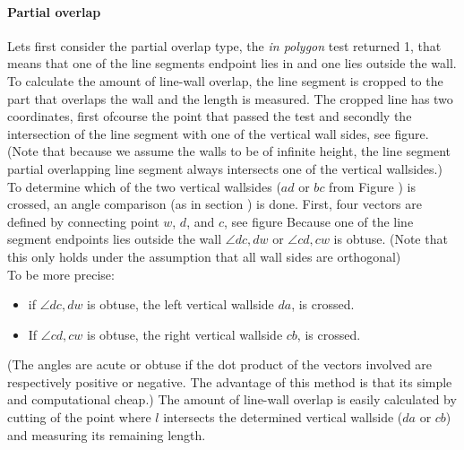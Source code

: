 \documentclass[10pt]{article}
\begin{document}
	\paragraph{Partial overlap}
	Lets first consider the partial overlap type, the \emph{in polygon} test
	returned 1, that means that one of the line segments endpoint lies in
	and one lies outside the wall.
	To calculate the amount of line-wall overlap, the line segment is cropped to the
	part that overlaps the wall and the length is measured. 
	The cropped line has two coordinates, first ofcourse the point that passed
	the  test and secondly the intersection of the line
	segment with one of the vertical wall sides, see figure. %
	(Note that because we assume the walls to be of infinite height, the line
	segment partial overlapping line segment always intersects one of the
	vertical wallsides.)
	To determine which of the two vertical wallsides ($ad$ or $bc$ from Figure
	)
	 is crossed, an angle comparison (as in section %
	 ) is done.
	First, four vectors are defined by connecting point $w$, $d$, and $c$, see figure %
	Because one of the line segment endpoints lies outside
	the wall $\angle dc, dw$ or $\angle cd, cw$ is obtuse. 
	(Note that this only holds under the assumption that all wall sides are orthogonal)\\
	To be more precise: 
	\begin{itemize}
	\item if $\angle dc, dw$ is obtuse, the left vertical wallside $da$, is
	crossed. \\
	\item If $\angle cd, cw$ is obtuse, the right vertical wallside $cb$, is
	crossed. \\
	\end{itemize}
	(The angles are acute or obtuse if the dot product of the vectors involved
	are respectively positive or negative. The advantage of this method is that
	its simple and computational cheap.)
	The amount of line-wall overlap is easily calculated by cutting of the
	point where $l$ intersects the determined vertical wallside ($da$ or
	$cb$) and measuring its remaining length.
\end{document}

